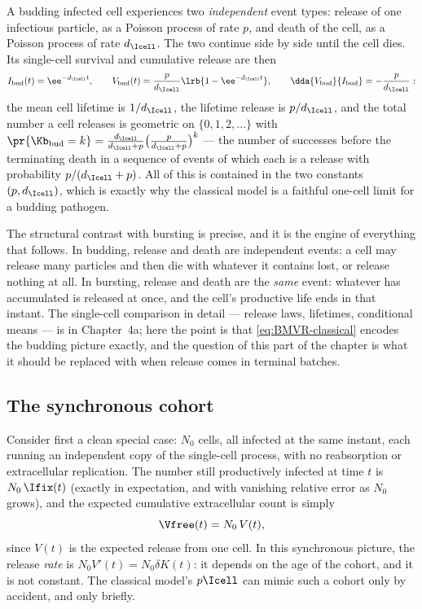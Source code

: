 A budding infected cell experiences two \emph{independent} event types:
release of one infectious particle, as a Poisson process of rate $p$, and
death of the cell, as a Poisson process of rate $d_{\Icell}$. The two
continue side by side until the cell dies. Its single-cell survival and
cumulative release are then
\begin{equation}
I_{\rm bud}(t)=\ee^{-d_{\Icell}t},\qquad
V_{\rm bud}(t)=\frac{p}{d_{\Icell}}\lrb{1-\ee^{-d_{\Icell}t}},
\qquad
\dda{V_{\rm bud}}{I_{\rm bud}}=-\frac{p}{d_{\Icell}}:
\label{eq:bud-cell}
\end{equation}
the mean cell lifetime is $1/d_{\Icell}$, the lifetime release is
$p/d_{\Icell}$, and the total number a cell releases is geometric on
$\{0,1,2,\ldots\}$ with
$\pr{\Kb_{\rm bud}=k}=\frac{d_{\Icell}}{d_{\Icell}+p}
\bigl(\frac{p}{d_{\Icell}+p}\bigr)^k$ --- the number of successes before
the terminating death in a sequence of events of which each is a release
with probability $p/(d_{\Icell}+p)$. All of this is contained in the two
constants $(p,d_{\Icell})$, which is exactly why the classical model is a
faithful one-cell limit for a budding pathogen.

The structural contrast with bursting is precise, and it is the engine of
everything that follows. In budding, release and death are independent
events: a cell may release many particles and then die with whatever it
contains lost, or release nothing at all. In bursting, release and death
are the \emph{same} event: whatever has accumulated is released at once,
and the cell's productive life ends in that instant. The single-cell
comparison in detail --- release laws, lifetimes, conditional means --- is
in Chapter~4a; here the point is that \eqref{eq:BMVR-classical} encodes the
budding picture exactly, and the question of this part of the chapter is
what it should be replaced with when release comes in terminal batches.

\subsection{The synchronous cohort}
\label{sec:sync-cohort}

Consider first a clean special case: $N_0$ cells, all infected at the same
instant, each running an independent copy of the single-cell process, with
no reabsorption or extracellular replication. The number still productively
infected at time $t$ is $N_0\,\Ifix(t)$ (exactly in expectation, and with
vanishing relative error as $N_0$ grows), and the expected cumulative
extracellular count is simply
\begin{equation}
\Vfree(t)=N_0\,V(t),
\end{equation}
since $V(t)$ is the expected release from one cell. In this synchronous
picture, the release \emph{rate} is $N_0 V'(t)=N_0\delta K(t)$: it depends
on the age of the cohort, and it is not constant. The classical model's
$p\Icell$ can mimic such a cohort only by accident, and only briefly.

